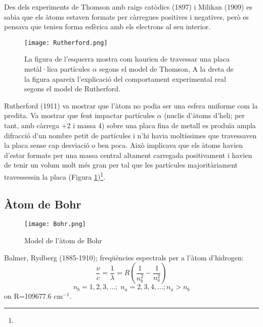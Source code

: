 Des dels experiments de Thomson amb raigs catòdics (1897) i Milikan (1909) es sabia que els àtoms estaven formats per càrregues positives i negatives, però es pensava que tenien forma esfèrica amb els electrons al seu interior.
\begin{figure}[h]
\centering
\texttt{[image: Rutherford.png]}
\caption[Model de Rutherford]{La figura de l'esquerra mostra com haurien de travessar una placa metàl·lica partícules $\alpha$ segons el model de Thomson, A la dreta de la figura apareix l'explicació del comportament experimental real segons el model de Rutherford.}
\label{fig:Rutherford}
\end{figure}
Rutherford (1911) va mostrar que l'àtom no podia ser una esfera uniforme com la predita. Va mostrar que fent impactar partícules $\alpha$ (nuclis d'àtoms d'heli; per tant, amb càrrega +2 i massa 4) sobre una placa fina de metall es produïa ampla difracció d'un nombre petit de partícules i n'hi havia moltíssimes que travessaven la placa sense cap desviació o ben poca. Això implicava que els àtoms havien d'estar formats per una massa central altament carregada positivament i havien de tenir un volum molt més gran per tal que les partícules majoritàriament travessessin la placa (Figura \ref{fig:Rutherford})\footnote{}.

\subsection{Àtom de Bohr}
\begin{figure}[h]
\centering
\texttt{[image: Bohr.png]}
\caption{Model de l'àtom de Bohr}
\label{fig:Bohr}
\end{figure}
Balmer, Rydberg (1885-1910); freqüències espectrals per a l'àtom d'hidrogen:
\begin{equation}
\frac{\nu}{c}=\frac{1}{\lambda}=R\left( \frac{1}{n_b^2}-\frac{1}{n_a^2}\right)
\label{eq:rydberg}
\end{equation}
\[
n_b=1,2,3,\dots; \; n_a=2,3,4,\dots; n_a>n_b
\]
on R=109677.6 cm$^{-1}$.

